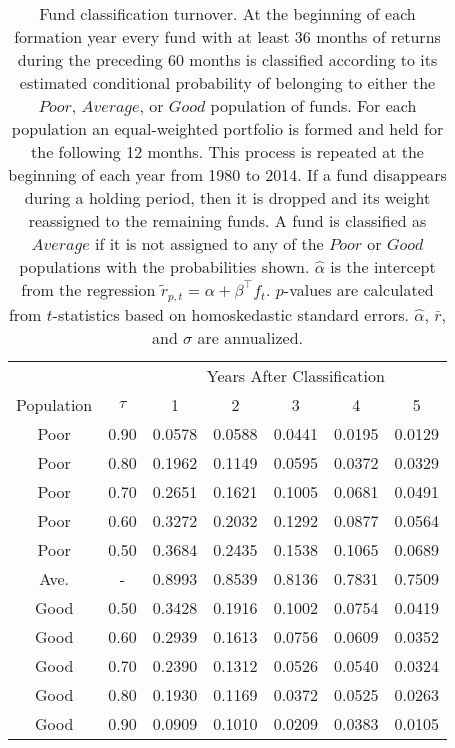 		\begin{table}[p]
			\centering
			\small
			    \begin{tabular}{*{7}{c}}
			    \toprule
			    & & \multicolumn{5}{c}{Years After Classification} \\
			    \cmidrule{3-7}
			    Population & $\tau$ & 1 & 2 & 3 & 4 & 5 \\
			    \midrule
			    Poor & 0.90 & 0.0578 & 0.0588 & 0.0441 & 0.0195 & 0.0129 \\
			    Poor & 0.80 & 0.1962 & 0.1149 & 0.0595 & 0.0372 & 0.0329 \\
			    Poor & 0.70 & 0.2651 & 0.1621 & 0.1005 & 0.0681 & 0.0491 \\
			    Poor & 0.60 & 0.3272 & 0.2032 & 0.1292 & 0.0877 & 0.0564 \\
			    Poor & 0.50 & 0.3684 & 0.2435 & 0.1538 & 0.1065 & 0.0689 \\
			    Ave. & - & 0.8993 & 0.8539 & 0.8136 & 0.7831 & 0.7509 \\
			    Good & 0.50 & 0.3428 & 0.1916 & 0.1002 & 0.0754 & 0.0419 \\
			    Good & 0.60 & 0.2939 & 0.1613 & 0.0756 & 0.0609 & 0.0352 \\
			    Good & 0.70 & 0.2390 & 0.1312 & 0.0526 & 0.0540 & 0.0324 \\
			    Good & 0.80 & 0.1930 & 0.1169 & 0.0372 & 0.0525 & 0.0263 \\
			    Good & 0.90 & 0.0909 & 0.1010 & 0.0209 & 0.0383 & 0.0105 \\
			    \bottomrule
			    \end{tabular}
			\captionsetup{position=below, font=footnotesize, justification=justified, width=0.72\linewidth}
			\caption[Fund classification turnover]{Fund classification turnover. At the beginning of each formation year every fund with at least 36 months of returns during the preceding 60 months is classified according to its estimated conditional probability of belonging to either the $Poor$, $Average$, or $Good$ population of funds.  For each population an equal-weighted portfolio is formed and held for the following 12 months.  This process is repeated at the beginning of each year from 1980 to 2014.  If a fund disappears during a holding period, then it is dropped and its weight reassigned to the remaining funds.  A fund is classified as $Average$ if it is not assigned to any of the $Poor$ or $Good$ populations with the probabilities shown.  $\hat{\alpha}$ is the intercept from the regression $\tilde{r}_{p,t} = \alpha + \beta^\top f_{t}$.  $p$-values are calculated from $t$-statistics based on homoskedastic standard errors. $\hat{\alpha}$, $\bar{r}$, and $\sigma$ are annualized.}
			\label{tab:turnover}
		\end{table}

